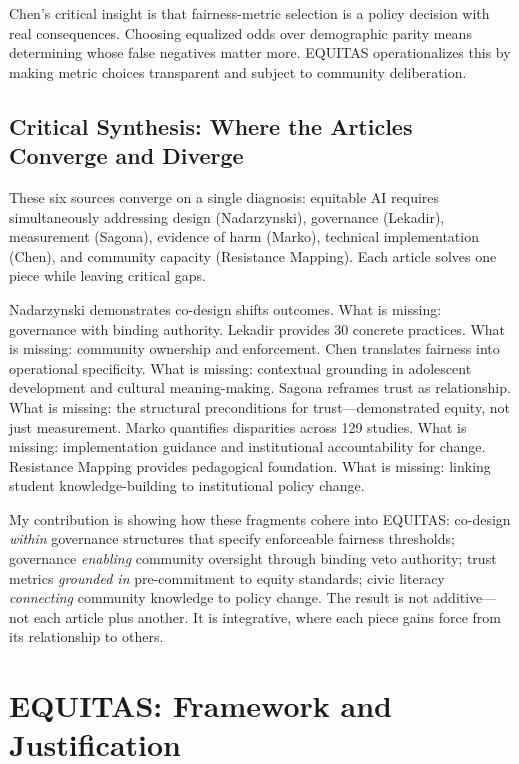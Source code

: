 \documentclass[12pt,a4paper]{article}
\begin{document}
Chen's critical insight is that fairness-metric selection is a policy decision with real consequences. Choosing equalized odds over demographic parity means determining whose false negatives matter more. EQUITAS operationalizes this by making metric choices transparent and subject to community deliberation.

\subsection{Critical Synthesis: Where the Articles Converge and Diverge}

These six sources converge on a single diagnosis: equitable AI requires simultaneously addressing design (Nadarzynski), governance (Lekadir), measurement (Sagona), evidence of harm (Marko), technical implementation (Chen), and community capacity (Resistance Mapping). Each article solves one piece while leaving critical gaps.

Nadarzynski demonstrates co-design shifts outcomes. What is missing: governance with binding authority. Lekadir provides 30 concrete practices. What is missing: community ownership and enforcement. Chen translates fairness into operational specificity. What is missing: contextual grounding in adolescent development and cultural meaning-making. Sagona reframes trust as relationship. What is missing: the structural preconditions for trust—demonstrated equity, not just measurement. Marko quantifies disparities across 129 studies. What is missing: implementation guidance and institutional accountability for change. Resistance Mapping provides pedagogical foundation. What is missing: linking student knowledge-building to institutional policy change.

My contribution is showing how these fragments cohere into EQUITAS: co-design \textit{within} governance structures that specify enforceable fairness thresholds; governance \textit{enabling} community oversight through binding veto authority; trust metrics \textit{grounded in} pre-commitment to equity standards; civic literacy \textit{connecting} community knowledge to policy change. The result is not additive—not each article plus another. It is integrative, where each piece gains force from its relationship to others.

\section{EQUITAS: Framework and Justification}
\end{document}
